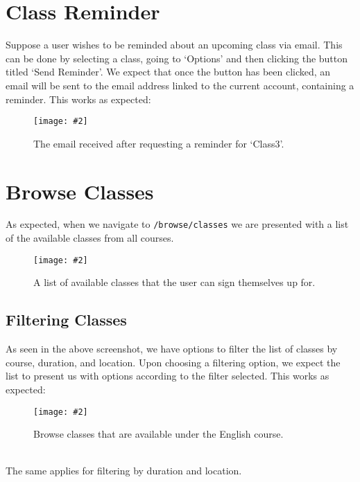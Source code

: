 \documentclass{article}
\newcommand{\screen}[3]{
    \begin{figure}[h]
    \centering
    \texttt{[image: \#2]}
    \caption{#3}
    \end{figure}
}
\begin{document}
\section{Class Reminder}
Suppose a user wishes to be reminded about an upcoming class via email.
This can be done by selecting a class, going to `Options' and then clicking the button titled `Send Reminder'.
We expect that once the button has been clicked, an email will be sent to the email address linked to the current account, containing a reminder.
This works as expected:
\screen{1}{email}{The email received after requesting a reminder for `Class3'.}

\section{Browse Classes}
As expected, when we navigate to \texttt{/browse/classes} we are presented with a list of the available classes from all courses.
\screen{1}{classes}{A list of available classes that the user can sign themselves up for.}

\subsection{Filtering Classes}
As seen in the above screenshot, we have options to filter the list of classes by course, duration, and location.
Upon choosing a filtering option, we expect the list to present us with options according to the filter selected.
This works as expected:
\screen{1}{class-filter}{Browse classes that are available under the English course.}\\
The same applies for filtering by duration and location.
\end{document}
